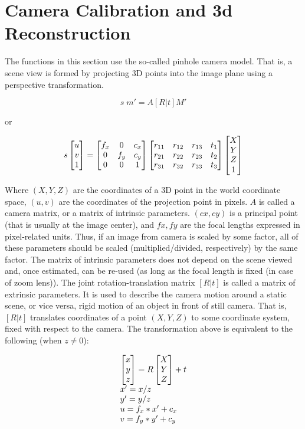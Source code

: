 \section{Camera Calibration and 3d Reconstruction}

The functions in this section use the so-called pinhole camera model. That
is, a scene view is formed by projecting 3D points into the image plane
using a perspective transformation.

\[
s \; m' = A [R|t] M'
\]

or

\[
s \begin{bmatrix} u\\ v\\ 1 \end{bmatrix} = \begin{bmatrix} f_x & 0 & c_x\\ 0 & f_y & c_y\\ 0 & 0 & 1 \end{bmatrix}
\begin{bmatrix}
 r_{11} & r_{12} & r_{13} & t_1 \\
 r_{21} & r_{22} & r_{23} & t_2 \\
 r_{31} & r_{32} & r_{33} & t_3
\end{bmatrix}
\begin{bmatrix}X\\Y\\Z\\1 \end{bmatrix}
\]

Where $(X, Y, Z)$ are the coordinates of a 3D point in the world
coordinate space, $(u, v)$ are the coordinates of the projection point
in pixels. $A$ is called a camera matrix, or a matrix of
intrinsic parameters. $(cx, cy)$ is a principal point (that is
usually at the image center), and $fx, fy$ are the focal lengths
expressed in pixel-related units. Thus, if an image from camera is
scaled by some factor, all of these parameters should
be scaled (multiplied/divided, respectively) by the same factor. The
matrix of intrinsic parameters does not depend on the scene viewed and,
once estimated, can be re-used (as long as the focal length is fixed (in
case of zoom lens)). The joint rotation-translation matrix $[R|t]$
is called a matrix of extrinsic parameters. It is used to describe the
camera motion around a static scene, or vice versa, rigid motion of an
object in front of still camera. That is, $[R|t]$ translates
coordinates of a point $(X, Y, Z)$ to some coordinate system,
fixed with respect to the camera. The transformation above is equivalent
to the following (when $z \ne 0$):

\[
\begin{array}{l}
\begin{bmatrix} x\\ y\\ z \end{bmatrix} = R \begin{bmatrix} X\\ Y\\ Z \end{bmatrix} + t\\
x' = x/z\\
y' = y/z\\
u = f_x*x' + c_x\\
v = f_y*y' + c_y
\end{array}
\]

